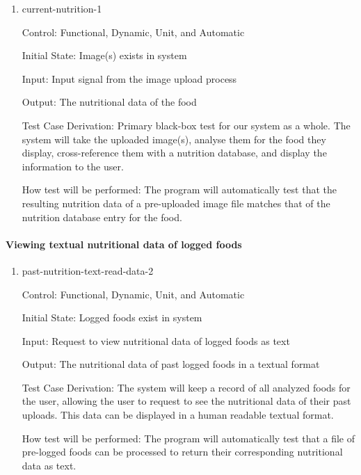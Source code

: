 \documentclass[12pt, titlepage]{article}
\begin{document}
	\begin{enumerate}
		
		\item{current-nutrition-1\\}
		
		Control: Functional, Dynamic, Unit, and Automatic
		
		Initial State: Image(s) exists in system
		
		Input: Input signal from the image upload process
		
		Output: The nutritional data of the food
		
		Test Case Derivation: Primary black-box test for our system as a whole. The system will take the uploaded image(s), analyse them for the food they display, cross-reference them with a nutrition database, and display the information to the user.
		
		How test will be performed: The program will automatically test that the resulting nutrition data of a pre-uploaded image file matches that of the nutrition database entry for the food.
		
	\end{enumerate}
	
	\paragraph{Viewing textual nutritional data of logged foods}
	
	\begin{enumerate}
		
		\item{past-nutrition-text-read-data-2\\}
		
		Control: Functional, Dynamic, Unit, and Automatic
		
		Initial State: Logged foods exist in system
		
		Input: Request to view nutritional data of logged foods as text
		
		Output: The nutritional data of past logged foods in a textual format
		
		Test Case Derivation: The system will keep a record of all analyzed foods for the user, allowing the user to request to see the nutritional data of their past uploads. This data can be displayed in a human readable textual format.
		
		How test will be performed: The program will automatically test that a file of pre-logged foods can be processed to return their corresponding nutritional data as text.
			
	\end{enumerate}
\end{document}
